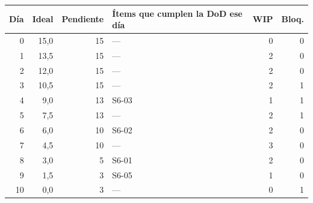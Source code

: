 \footnotesize
\begin{tabularx}{\linewidth}{r r r X r r}
\toprule
\textbf{Día} & \textbf{Ideal} & \textbf{Pendiente} & \textbf{Ítems que cumplen la DoD ese día} & \textbf{WIP} & \textbf{Bloq.} \\
\midrule
0 & 15,0 & 15 & — & 0 & 0 \\
1 & 13,5 & 15 & — & 2 & 0 \\
2 & 12,0 & 15 & — & 2 & 0 \\
3 & 10,5 & 15 & — & 2 & 1 \\
4 & 9,0 & 13 & S6-03 & 1 & 1 \\
5 & 7,5 & 13 & — & 2 & 1 \\
6 & 6,0 & 10 & S6-02 & 2 & 0 \\
7 & 4,5 & 10 & — & 3 & 0 \\
8 & 3,0 & 5 & S6-01 & 2 & 0 \\
9 & 1,5 & 3 & S6-05 & 1 & 0 \\
10 & 0,0 & 3 & — & 0 & 1 \\
\bottomrule
\end{tabularx}
